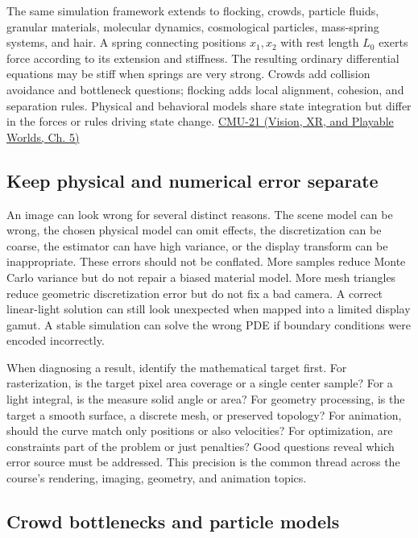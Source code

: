 The same simulation framework extends to flocking, crowds, particle fluids, granular materials, molecular dynamics, cosmological particles, mass-spring systems, and hair. A spring connecting positions \(x_1,x_2\) with rest length \(L_0\) exerts force according to its extension and stiffness. The resulting ordinary differential equations may be stiff when springs are very strong. Crowds add collision avoidance and bottleneck questions; flocking adds local alignment, cohesion, and separation rules. Physical and behavioral models share state integration but differ in the forces or rules driving state change. \href{../07-Vision-XR-and-Playable-Worlds/main.pdf\#nameddest=04-visual-computing-ii-ch036-cmu-21---dynamics-and-time-integration}{CMU-21 (Vision, XR, and Playable Worlds, Ch. 5)}

\subsection{Keep physical and numerical error separate}\label{04-visual-computing-ii-ch029-keep-physical-and-numerical-error-separate}

An image can look wrong for several distinct reasons. The scene model can be wrong, the chosen physical model can omit effects, the discretization can be coarse, the estimator can have high variance, or the display transform can be inappropriate. These errors should not be conflated. More samples reduce Monte Carlo variance but do not repair a biased material model. More mesh triangles reduce geometric discretization error but do not fix a bad camera. A correct linear-light solution can still look unexpected when mapped into a limited display gamut. A stable simulation can solve the wrong PDE if boundary conditions were encoded incorrectly.

When diagnosing a result, identify the mathematical target first. For rasterization, is the target pixel area coverage or a single center sample? For a light integral, is the measure solid angle or area? For geometry processing, is the target a smooth surface, a discrete mesh, or preserved topology? For animation, should the curve match only positions or also velocities? For optimization, are constraints part of the problem or just penalties? Good questions reveal which error source must be addressed. This precision is the common thread across the course's rendering, imaging, geometry, and animation topics.

\subsection{Crowd bottlenecks and particle models}\label{04-visual-computing-ii-ch029-crowd-bottlenecks-and-particle-models}

